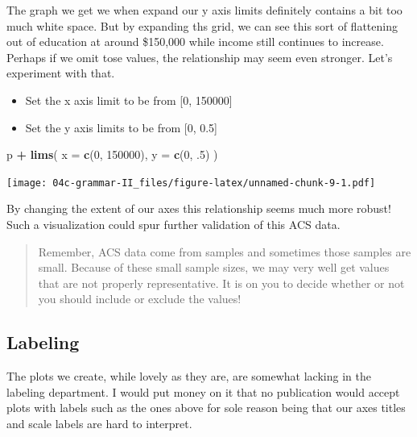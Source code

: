 \documentclass[
]{book}
\newenvironment{Shaded}{\begin{snugshade}}{\end{snugshade}}
\newcommand{\DataTypeTok}[1]{\textcolor[rgb]{0.13,0.29,0.53}{#1}}
\newcommand{\DecValTok}[1]{\textcolor[rgb]{0.00,0.00,0.81}{#1}}
\newcommand{\FloatTok}[1]{\textcolor[rgb]{0.00,0.00,0.81}{#1}}
\newcommand{\KeywordTok}[1]{\textcolor[rgb]{0.13,0.29,0.53}{\textbf{#1}}}
\newcommand{\NormalTok}[1]{#1}
\newcommand{\OperatorTok}[1]{\textcolor[rgb]{0.81,0.36,0.00}{\textbf{#1}}}
\newcommand{\StringTok}[1]{\textcolor[rgb]{0.31,0.60,0.02}{#1}}
\providecommand{\tightlist}{%
  \setlength{\itemsep}{0pt}\setlength{\parskip}{0pt}}
\begin{document}
The graph we get we when expand our y axis limits definitely contains a bit too much white space. But by expanding ths grid, we can see this sort of flattening out of education at around \$150,000 while income still continues to increase. Perhaps if we omit tose values, the relationship may seem even stronger. Let's experiment with that.

\begin{itemize}
\tightlist
\item
  Set the x axis limit to be from {[}0, 150000{]}
\item
  Set the y axis limits to be from {[}0, 0.5{]}
\end{itemize}

\begin{Shaded}
\begin{Highlighting}[]
\NormalTok{p }\OperatorTok{+}
\StringTok{  }\KeywordTok{lims}\NormalTok{(}
    \DataTypeTok{x =} \KeywordTok{c}\NormalTok{(}\DecValTok{0}\NormalTok{, }\DecValTok{150000}\NormalTok{),}
    \DataTypeTok{y =} \KeywordTok{c}\NormalTok{(}\DecValTok{0}\NormalTok{, }\FloatTok{.5}\NormalTok{)}
\NormalTok{    )}
\end{Highlighting}
\end{Shaded}

\texttt{[image: 04c-grammar-II\_files/figure-latex/unnamed-chunk-9-1.pdf]}

By changing the extent of our axes this relationship seems much more robust! Such a visualization could spur further validation of this ACS data.

\begin{quote}
Remember, ACS data come from samples and sometimes those samples are small. Because of these small sample sizes, we may very well get values that are not properly representative. It is on you to decide whether or not you should include or exclude the values!
\end{quote}

\hypertarget{labeling}{%
\subsection{Labeling}\label{labeling}}

The plots we create, while lovely as they are, are somewhat lacking in the labeling department. I would put money on it that no publication would accept plots with labels such as the ones above for sole reason being that our axes titles and scale labels are hard to interpret.
\end{document}
